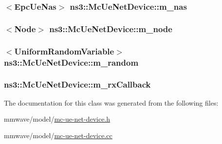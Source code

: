 \subsubsection[{\texorpdfstring{m\+\_\+nas}{m_nas}}]{$<${\bf Epc\+Ue\+Nas}$>$ ns3\+::\+Mc\+Ue\+Net\+Device\+::m\+\_\+nas\hspace{0.3cm}{\ttfamily [private]}}\hypertarget{classns3_1_1McUeNetDevice_ad28cd170780f825a1d8b12beb814a511}{}\label{classns3_1_1McUeNetDevice_ad28cd170780f825a1d8b12beb814a511}
\subsubsection[{\texorpdfstring{m\+\_\+node}{m_node}}]{$<${\bf Node}$>$ ns3\+::\+Mc\+Ue\+Net\+Device\+::m\+\_\+node\hspace{0.3cm}{\ttfamily [private]}}\hypertarget{classns3_1_1McUeNetDevice_a322725b9dad6b9f01eebe9f2b23fc6f6}{}\label{classns3_1_1McUeNetDevice_a322725b9dad6b9f01eebe9f2b23fc6f6}
\subsubsection[{\texorpdfstring{m\+\_\+random}{m_random}}]{$<${\bf Uniform\+Random\+Variable}$>$ ns3\+::\+Mc\+Ue\+Net\+Device\+::m\+\_\+random\hspace{0.3cm}{\ttfamily [private]}}\hypertarget{classns3_1_1McUeNetDevice_aad7812e41e8bf96bebc98606d8d2157f}{}\label{classns3_1_1McUeNetDevice_aad7812e41e8bf96bebc98606d8d2157f}
\subsubsection[{\texorpdfstring{m\+\_\+rx\+Callback}{m_rxCallback}}]{ ns3\+::\+Mc\+Ue\+Net\+Device\+::m\+\_\+rx\+Callback\hspace{0.3cm}{\ttfamily [protected]}}\hypertarget{classns3_1_1McUeNetDevice_a0b31e145c1f08f7563b6c334f4d69244}{}\label{classns3_1_1McUeNetDevice_a0b31e145c1f08f7563b6c334f4d69244}


The documentation for this class was generated from the following files\+:\begin{DoxyCompactItemize}
\item 
mmwave/model/\hyperlink{mc-ue-net-device_8h}{mc-\/ue-\/net-\/device.\+h}\item 
mmwave/model/\hyperlink{mc-ue-net-device_8cc}{mc-\/ue-\/net-\/device.\+cc}\end{DoxyCompactItemize}
